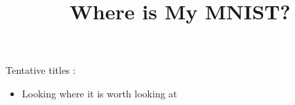 \documentclass[]{article}
\title{Where is My MNIST?}
\author{}
\begin{document}
\maketitle

Tentative titles :
\begin{itemize}
	\item Looking where it is worth looking at
\end{itemize}

\begin{abstract}

\end{abstract}

\section{}
\end{document}
